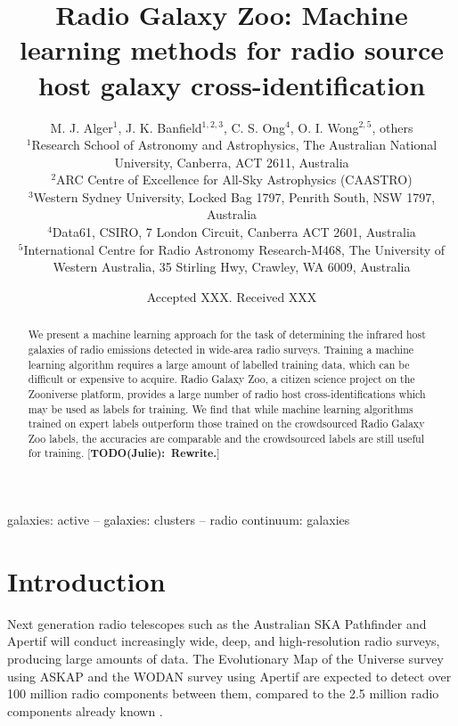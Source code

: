 \documentclass[fleqn,usenatbib,usedcolumn]{mnras}
\title[ML CDFS]{Radio Galaxy Zoo: Machine learning methods for radio source host galaxy cross-identification}
\author[RGZ ML Team]{M. J. Alger$^{1}$, J. K. Banfield$^{1, 2, 3}$, C. S. Ong$^{4}$, O. I. Wong$^{2, 5}$, others
\\
$^{1}$Research School of Astronomy and Astrophysics, The Australian National University, Canberra, ACT 2611, Australia\\
$^{2}$ARC Centre of Excellence for All-Sky Astrophysics (CAASTRO)\\
$^{3}$Western Sydney University, Locked Bag 1797, Penrith South, NSW 1797, Australia\\
$^{4}$Data61, CSIRO, 7 London Circuit, Canberra ACT 2601, Australia\\
$^{5}$International Centre for Radio Astronomy Research-M468, The University of Western Australia, 35 Stirling Hwy, Crawley, WA 6009, Australia
}
\date{Accepted XXX. Received XXX}
\newcommand{\matthew}[2]{ {\color{white!20!violet}[{\bf TODO(#1):~{#2}}]} }
\begin{document}
\label{firstpage}
\pagerange{\pageref{firstpage}--\pageref{lastpage}}
\maketitle

\begin{abstract}
  We present a machine learning approach for the task of determining the
  infrared host galaxies of radio emissions detected in wide-area radio surveys.
  Training a machine learning algorithm requires a large amount of labelled
  training data, which can be difficult or expensive to acquire. Radio Galaxy
  Zoo, a citizen science project on the Zooniverse platform, provides a large
  number of radio host cross-identifications which may be used as labels for
  training. We find that while machine learning algorithms trained on expert
  labels outperform those trained on the crowdsourced Radio Galaxy Zoo labels,
  the accuracies are comparable and the crowdsourced labels are still useful for
  training. \matthew{Julie}{Rewrite.}
\end{abstract}

\begin{keywords}
galaxies: active -- galaxies: clusters -- radio continuum: galaxies
\end{keywords}


\section{Introduction}\label{introduction}

  Next generation radio telescopes such as the Australian SKA Pathfinder
  \citep[ASKAP;][]{johnston07} and Apertif \citep{verheijen08} will conduct
  increasingly wide, deep, and high-resolution radio surveys, producing large
  amounts of data. The Evolutionary Map of the Universe survey
  \citep[EMU;][]{norris11} using ASKAP and the WODAN survey \citep{rottgering11}
  using Apertif are expected to detect over 100 million radio components between
  them, compared to the 2.5 million radio components already known
  \citep{banfield15}.
\end{document}
